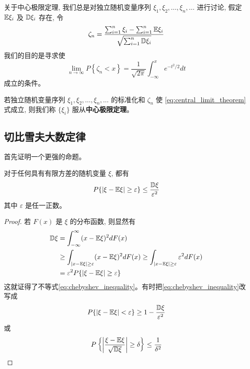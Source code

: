 关于中心极限定理, 我们总是对独立随机变量序列 $\xi_1, \xi_2, \ldots, \xi_n, \ldots$ 进行讨论, 假定 $\mathbb{E}\xi_i$ 及 $\mathbb{D}\xi_i$ 存在, 令
\begin{equation} \label{eq:zeta_n}
\zeta_n = \frac{\sum_{i=1}^n \xi_i - \sum_{i=1}^n \mathbb{E}\xi_i}{\sqrt{\sum_{i=1}^n \mathbb{D}\xi_i}}
\end{equation}
我们的目的是寻求使
\begin{equation} \label{eq:central_limit_theorem}
\lim_{n \to \infty} P \left\{ \zeta_n < x \right\} = \frac{1}{\sqrt{2\pi}} \int_{-\infty}^x e^{-t^2/2} dt
\end{equation}
成立的条件。
\begin{definition}[中心极限定理]\label{def:central_limit_theorem}
    若独立随机变量序列 $\xi_1, \xi_2, \ldots, \xi_n, \ldots$ 的标准化和 $\zeta_n$ 使 \eqref{eq:central_limit_theorem} 式成立, 则我们称 $\{ \xi_i \}$ 服从\textbf{中心极限定理}。
\end{definition}
\subsection{切比雪夫大数定律}\label{subsubsec:切比雪夫大数定律}
首先证明一个更强的命题。
\begin{lemma}[切比雪夫不等式]\label{lem:chebyshev_inequality}
    对于任何具有有限方差的随机变量 $\xi$, 都有
\begin{equation} \label{eq:chebyshev_inequality}
P\{|\xi - \mathbb{E}\xi| \ge \varepsilon\} \le \frac{\mathbb{D}\xi}{\varepsilon^2}
\end{equation}
其中 $\varepsilon$ 是任一正数。
\end{lemma}
\begin{proof}
    若 $F(x)$ 是 $\xi$ 的分布函数, 则显然有
\begin{align}
\mathbb{D}\xi &= \int_{-\infty}^{\infty} (x - \mathbb{E}\xi)^2 dF(x) \notag \\
&\ge \int_{|x - \mathbb{E}\xi| \ge \varepsilon} (x - \mathbb{E}\xi)^2 dF(x) \ge \int_{|x - \mathbb{E}\xi| \ge \varepsilon} \varepsilon^2 dF(x) \notag \\
&= \varepsilon^2 P\{|\xi - \mathbb{E}\xi| \ge \varepsilon\} \label{eq:chebyshev_proof}
\end{align}
这就证得了不等式\eqref{eq:chebyshev_inequality}。有时把\eqref{eq:chebyshev_inequality}改写成
\begin{equation} \label{eq:chebyshev_form2}
P\{|\xi - \mathbb{E}\xi|<\varepsilon\} \ge 1 - \frac{\mathbb{D}\xi}{\varepsilon^2}
\end{equation}
或
\begin{equation} \label{eq:chebyshev_form3}
P\left\{\left|\frac{\xi - \mathbb{E}\xi}{\sqrt{\mathbb{D}\xi}}\right| \ge \delta\right\} \le \frac{1}{\delta^2}
\end{equation}

\end{proof}

